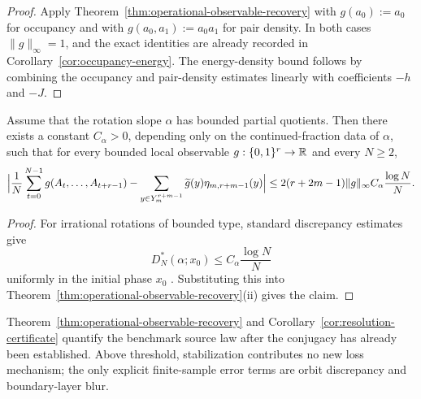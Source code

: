\begin{proof}
Apply Theorem~\ref{thm:operational-observable-recovery} with $g(a_0):=a_0$ for occupancy and with $g(a_0,a_1):=a_0a_1$ for pair density. In both cases $\|g\|_\infty=1$, and the exact identities are already recorded in Corollary~\ref{cor:occupancy-energy}. The energy-density bound follows by combining the occupancy and pair-density estimates linearly with coefficients $-h$ and $-J$.
\end{proof}

\begin{corollary}\label{cor:tv-bounded-type}
Assume that the rotation slope $\alpha$ has bounded partial quotients. Then there exists a constant $C_\alpha>0$, depending only on the continued-fraction data of $\alpha$, such that for every bounded local observable $g:\{0,1\}^r\to\mathbb{R}$ and every $N\ge 2$,
\[
\Bigl|
\frac1N\sum_{t=0}^{N-1} g(A_t,\dots,A_{t+r-1})
-
\sum_{y\in Y_m^{r+m-1}}\widetilde g(y)\eta_{m,r+m-1}(y)
\Bigr|
\le
2(r+2m-1)\|g\|_\infty C_\alpha\frac{\log N}{N}.
\]
\end{corollary}

\begin{proof}
For irrational rotations of bounded type, standard discrepancy estimates give
\[
D_N^*(\alpha;x_0)\le C_\alpha\frac{\log N}{N}
\]
uniformly in the initial phase $x_0$ \cite{KuipersNiederreiter1974,DrmotaTichy1997}. Substituting this into Theorem~\ref{thm:operational-observable-recovery}(ii) gives the claim.
\end{proof}

\begin{remark}
Theorem~\ref{thm:operational-observable-recovery} and Corollary~\ref{cor:resolution-certificate} quantify the benchmark source law after the conjugacy has already been established. Above threshold, stabilization contributes no new loss mechanism; the only explicit finite-sample error terms are orbit discrepancy and boundary-layer blur.
\end{remark}

